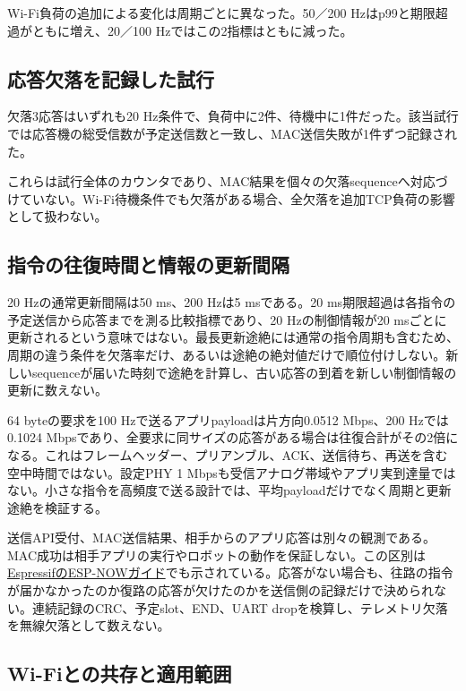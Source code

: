 \documentclass[a4paper,10pt]{ltjsarticle}
\begin{document}
Wi-Fi負荷の追加による変化は周期ごとに異なった。50／200 Hzはp99と期限超過がともに増え、20／100 Hzではこの2指標はともに減った。

\subsection{応答欠落を記録した試行}

欠落3応答はいずれも20 Hz条件で、負荷中に2件、待機中に1件だった。該当試行では応答機の総受信数が予定送信数と一致し、MAC送信失敗が1件ずつ記録された。

これらは試行全体のカウンタであり、MAC結果を個々の欠落sequenceへ対応づけていない。Wi-Fi待機条件でも欠落がある場合、全欠落を追加TCP負荷の影響として扱わない。

\subsection{指令の往復時間と情報の更新間隔}

20 Hzの通常更新間隔は50 ms、200 Hzは5 msである。20 ms期限超過は各指令の予定送信から応答までを測る比較指標であり、20 Hzの制御情報が20 msごとに更新されるという意味ではない。最長更新途絶には通常の指令周期も含むため、周期の違う条件を欠落率だけ、あるいは途絶の絶対値だけで順位付けしない。新しいsequenceが届いた時刻で途絶を計算し、古い応答の到着を新しい制御情報の更新に数えない。

64 byteの要求を100 Hzで送るアプリpayloadは片方向0.0512 Mbps、200 Hzでは0.1024 Mbpsであり、全要求に同サイズの応答がある場合は往復合計がその2倍になる。これはフレームヘッダー、プリアンブル、ACK、送信待ち、再送を含む空中時間ではない。設定PHY 1 Mbpsも受信アナログ帯域やアプリ実到達量ではない。小さな指令を高頻度で送る設計では、平均payloadだけでなく周期と更新途絶を検証する。

送信API受付、MAC送信結果、相手からのアプリ応答は別々の観測である。MAC成功は相手アプリの実行やロボットの動作を保証しない。この区別は\href{https://docs.espressif.com/projects/esp-idf/en/v6.0/esp32/api-reference/network/esp\_now.html\#send-esp-now-data}{EspressifのESP-NOWガイド}でも示されている。応答がない場合も、往路の指令が届かなかったのか復路の応答が欠けたのかを送信側の記録だけで決められない。連続記録のCRC、予定slot、END、UART dropを検算し、テレメトリ欠落を無線欠落として数えない。

\subsection{Wi-Fiとの共存と適用範囲}
\end{document}

